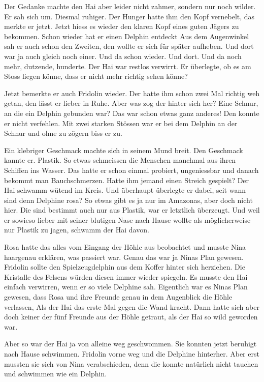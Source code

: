 Der Gedanke machte den Hai aber leider nicht zahmer, sondern nur noch wilder. Er sah sich um. Diesmal ruhiger. Der Hunger hatte ihm den Kopf vernebelt, das merkte er jetzt. Jetzt hiess es wieder den klaren Kopf eines guten Jägers zu bekommen. Schon wieder hat er einen Delphin entdeckt Aus dem Augenwinkel sah er auch schon den Zweiten, den wollte er sich für später aufheben. Und dort war ja auch gleich noch einer. Und da schon wieder. Und dort. Und da noch mehr, dutzende, hunderte. Der Hai war restlos verwirrt. Er überlegte, ob es am Stoss liegen könne, dass er nicht mehr richtig sehen könne?

Jetzt bemerkte er auch Fridolin wieder. Der hatte ihm schon zwei Mal richtig weh getan, den lässt er lieber in Ruhe. Aber was zog der hinter sich her? Eine Schnur, an die ein Delphin gebunden war? Das war schon etwas ganz anderes! Den konnte er nicht verfehlen. Mit zwei starken Stössen war er bei dem Delphin an der Schnur und ohne zu zögern biss er zu.

Ein klebriger Geschmack machte sich in seinem Mund breit. Den Geschmack kannte er. Plastik. So etwas schmeissen die Menschen manchmal aus ihren Schiffen ins Wasser. Das hatte er schon einmal probiert, ungeniessbar und danach bekommt man Bauchschmerzen. Hatte ihm jemand einen Streich gespielt? Der Hai schwamm wütend im Kreis. Und überhaupt überlegte er dabei, seit wann sind denn Delphine rosa? So etwas gibt es ja nur im Amazonas, aber doch nicht hier. Die sind bestimmt auch nur aus Plastik, war er letztlich überzeugt.  Und weil er sowieso lieber mit seiner blutigen Nase nach Hause wollte als möglicherweise nur Plastik zu jagen, schwamm der Hai davon.

Rosa hatte das alles vom Eingang der Höhle aus beobachtet und musste Nina haargenau erklären, was passiert war. Genau das war ja Ninas Plan gewesen. Fridolin sollte den Spielzeugdelphin aus dem Koffer hinter sich herziehen. Die Kristalle des Felsens würden diesen immer wieder spiegeln. Es musste den Hai einfach verwirren, wenn er so viele Delphine sah. Eigentlich war es Ninas Plan gewesen, dass Rosa und ihre Freunde genau in dem Augenblick die Höhle verlassen, Als der Hai das erste Mal gegen die Wand kracht. Dann hatte sich aber doch keiner der fünf Freunde aus der Höhle getraut, als der Hai so wild geworden war.

Aber so war der Hai ja von alleine weg geschwommen. Sie konnten jetzt beruhigt nach Hause schwimmen. Fridolin vorne weg und die Delphine hinterher. Aber erst mussten sie sich von Nina verabschieden, denn die konnte natürlich nicht tauchen und schwimmen wie ein Delphin. 

